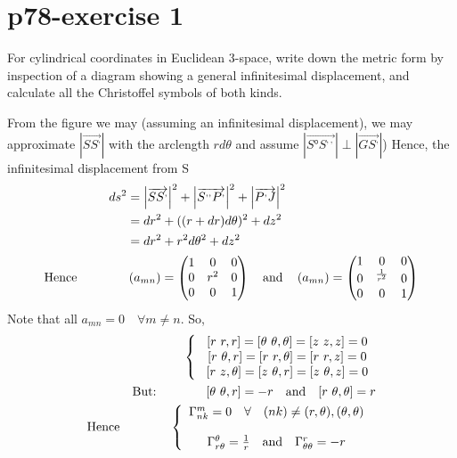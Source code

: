 \section{p78-exercise 1}
\begin{tcolorbox}
For cylindrical coordinates in Euclidean 3-space, write down the metric form by inspection of a diagram showing a general infinitesimal displacement, and calculate all the Christoffel symbols of both kinds.
\end{tcolorbox}
\begin{figure}[h]


\label{fig:fig_p78_247_a}
\end{figure}
From the figure we may (assuming an infinitesimal displacement), we may approximate $\left| \overrightarrow{SS^{,}} \right|$ with the arclength $r d\theta$ and assume $\left|  \overrightarrow{S°S^{,,}} \right| \perp \left|  \overrightarrow{GS^{,}} \right|$) Hence, the infinitesimal displacement from S
\begin{align}
\ ds^2 &= \left| \overrightarrow{SS^{,}} \right|^2 + \left| \overrightarrow{S^{,,}P^{,}} \right|^2+\left| \overrightarrow{P^{,}J} \right|^2\\
\ &= dr^2 + ((r+dr)d\theta)^2 + dz^2\\
\ &= dr^2 + r^2d\theta^2 + dz^2\\
\text{Hence} \quad\quad\quad\quad &\left(a_{mn}\right) = \begin{pmatrix}
 1& 0 & 0 \\
 0&  r^2&0  \\
 0&0  &1  \\
\end{pmatrix}\quad\text{and}\quad \left(a_{mn}\right) = \begin{pmatrix}
 1& 0 & 0 \\
 0&  ^\frac{1}{r^2}&0  \\
 0&0  &1  \\
\end{pmatrix}
\end{align}
Note that all $a_{mn} = 0 \quad \forall m\ne n$. So,
\begin{align}
\left \{ \begin{array}{c}
\ [r \ r,r]=[\theta \  \theta, \theta] = [z \ z,z] = 0\\
\ [r \ \theta,r]=[r \ r, \theta] = [r \ r,z] = 0\\
\ [r \ z,\theta]=[z \  \theta, r] = [z \ \theta,z] = 0\\
\end{array}\right.\\
\text{But:}\quad\quad\quad\quad [\theta \ \theta,r]= -r \quad\text{and}\quad [r \  \theta, \theta] = r\\
\text{Hence}\quad\quad\quad\quad \left \{ \begin{array}{c}
\Gamma^m_{nk} = 0 \quad\forall\quad (nk) \ne (r, \theta), (\theta, \theta)\\\\
\Gamma^{\theta}_{r\theta} = \frac{1}{r} \quad\text{and}\quad \Gamma^r_{\theta\theta} = -r
\end{array}\right.\
\end{align}

